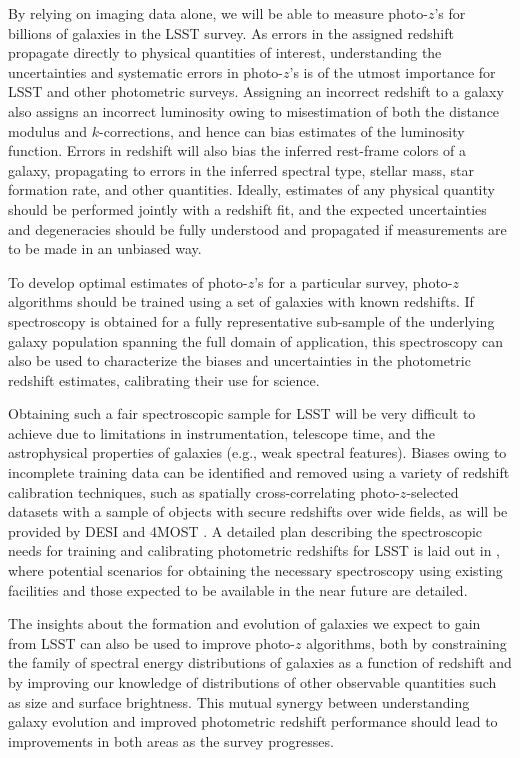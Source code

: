 {By relying on imaging data alone, we will be able to measure photo-$z$'s for billions of galaxies in the LSST survey. 
As errors in the assigned redshift propagate directly to physical quantities of interest, understanding the uncertainties and systematic errors in photo-$z$'s is of the utmost importance for LSST and other photometric surveys. 
Assigning an incorrect redshift to a galaxy also assigns an incorrect luminosity 
owing to misestimation of both the distance modulus and $k$-corrections, and hence can bias estimates of the luminosity function. Errors in redshift will also bias the inferred rest-frame colors of a galaxy, propagating to errors in the inferred spectral type, stellar mass, star formation rate, and other quantities.  
Ideally, estimates of any physical quantity should be performed jointly with a redshift fit, and the expected uncertainties and degeneracies should be fully understood and propagated if measurements are to be
made in an unbiased way.  

To develop optimal estimates of photo-$z$'s  for a particular survey, photo-$z$ algorithms 
should be trained using a set of galaxies with known redshifts. If spectroscopy is obtained for a fully representative sub-sample of the underlying galaxy population spanning the full domain of application, this spectroscopy can also be used to characterize the biases and uncertainties in the photometric redshift estimates, calibrating their use for science.

Obtaining such a fair spectroscopic sample for LSST will be very difficult to achieve due to limitations in instrumentation, telescope time, and the astrophysical properties of galaxies (e.g., weak spectral features). 
Biases owing to incomplete training data can be identified and removed using a variety of redshift calibration techniques, such as spatially cross-correlating photo-$z$-selected datasets with a sample of objects with secure redshifts over wide fields, as will be provided by DESI and 4MOST \citep{newman2008a}.  A detailed plan describing the spectroscopic needs for training and calibrating photometric redshifts for LSST is laid out in \citet[]{newman2015a}, where potential scenarios for obtaining the necessary spectroscopy using existing facilities and those expected to be available in the near future are detailed.   

The insights about the formation and evolution of galaxies we expect to gain from LSST can also be used to improve photo-$z$ algorithms, both by constraining the family of spectral energy distributions of galaxies as a function of redshift and by improving our knowledge of distributions of other observable quantities such as size and surface brightness.  This mutual synergy between understanding galaxy evolution and improved photometric redshift performance should lead to improvements in both areas as the survey progresses.

}
